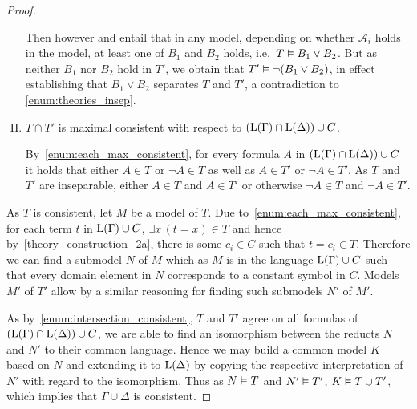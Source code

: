 \begin{proof}
\begin{enumerate}[I.]
			Then however \markA{} and \markB{} entail that in any model, depending on whether $\mathcal{A}_i$ holds in the model, at least one of $B_1$ and $B_2$ holds, i.e.\ $T \vDash B_1 \lor B_2$.
			But as neither $B_1$ nor $B_2$ hold in $T'$, we obtain that $T' \vDash \lnot (B_1 \lor B_2)$, in effect establishing that $B_1 \lor B_2$ separates $T$ and $T'$, a contradiction to \ref{enum:theories_insep}.


		\item
			\label{enum:intersection_consistent}
			$T \cap T'$ is maximal consistent with respect to $(\operatorname{L}(\Gamma) \cap \operatorname{L}(\Delta)) \cup C$.

			By~\ref{enum:each_max_consistent}, for every formula $A$ in $(\operatorname{L}(\Gamma) \cap \operatorname{L}(\Delta)) \cup C$ it holds that either 
			$A \in T$ or $\lnot A \in T$ as well as
			$A \in T'$ or $\lnot A \in T'$. As $T$ and $T'$ are inseparable, either $A \in T$ and $A\in T'$ or otherwise $\lnot A \in T$ and $\lnot A \in T'$.

	\end{enumerate}


	As $T$ is consistent, let $M$ be a model of $T$.
	Due to~\ref{enum:each_max_consistent}, for each term $t$ in $\operatorname{L}(\Gamma)\cup C$, $\exists x\, (t = x) \in T$ and hence by~\ref{theory_construction_2a}, there is some $c_i \in C$ such that $t=c_i \in T$.
	Therefore we can find a submodel $N$ of $M$ which as $M$ is in the language $\operatorname{L}(\Gamma)\cup C$ such that
	every domain element in $N$ corresponds to a constant symbol in $C$.
	Models $M'$ of $T'$ allow by a similar reasoning for finding such submodels $N'$ of $M'$.

	As by~\ref{enum:intersection_consistent}, $T$ and $T'$ agree on all formulas of $(\operatorname{L}(\Gamma) \cap \operatorname{L}(\Delta))\cup C$, 
	we are able to find an isomorphism between the reducts $N$ and $N'$ to their common language.
	Hence we may build a common model $K$ based on $N$ and extending it to $\operatorname{L}(\Delta)$ by copying the respective interpretation of $N'$ with regard to the isomorphism.
	Thus as $N\vDash T$ and $N'\vDash T'$, $K\vDash T \cup T'$, which implies that $\Gamma\cup\Delta$ is consistent.
\end{proof}


